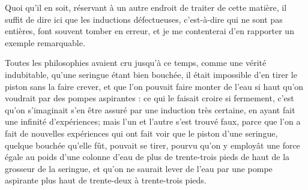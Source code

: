 Quoi qu'il en soit, réservant à un autre endroit de traiter de cette matière, il suffit de dire ici que les inductions défectueuses, c'est-à-dire qui ne sont pas entières, font souvent tomber en erreur, et je me contenterai d'en rapporter un exemple remarquable.

Toutes les philosophies avaient cru jusqu'à ce temps, comme une vérité indubitable, qu'une seringue étant bien bouchée, il était impossible d'en tirer le piston sans la faire crever, et que l'on pouvait faire monter de l'eau si haut qu'on voudrait par des pompes aspirantes : ce qui le faisait croire si fermement, c'est qu'on s'imaginait s'en être assuré par une induction très certaine, en ayant fait une infinité d'expériences; mais l'un et l'autre s'est trouvé faux, parce que l'on a fait de nouvelles expériences qui ont fait voir que le piston d'une seringue, quelque bouchée qu'elle fût, pouvait se tirer, pourvu qu'on y employât une force égale au poids d'une colonne d'eau de plus de trente-trois pieds de haut de la grosseur de la seringue, et qu'on ne saurait lever de l'eau par une pompe aspirante plus haut de trente-deux à trente-trois pieds.


